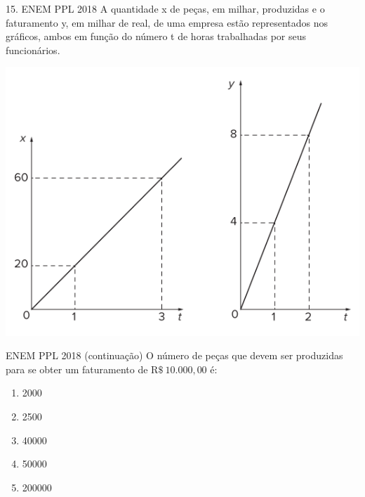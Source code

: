 \documentclass[11pt]{beamer}
\begin{document}
\begin{frame}{15. ENEM PPL 2018}
    A quantidade x de peças, em milhar, produzidas e o faturamento y, em milhar de real, de uma empresa estão representados nos gráficos, ambos em função do número t de horas trabalhadas por seus funcionários.

    \begin{center}
        \includegraphics[scale=0.4]{imagens/enem-ppl-2018.png}
    \end{center}
    
\end{frame}

\begin{frame}{ENEM PPL 2018 (continuação)}
     O número de peças que devem ser produzidas para se obter um faturamento de R$\$\  10.000,00$ é:

    \begin{enumerate}[a]
        \item 2000
        \item 2500
        \item 40000
        \item 50000 %
        \item 200000
    \end{enumerate}
\end{frame}
\end{document}

